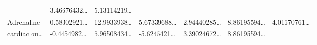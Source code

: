 \documentclass[
]{article}
\begin{document}
\begin{longtable}[]{@{}lllllll@{}}
\begin{minipage}[t]{0.12\columnwidth}
\end{minipage} & \begin{minipage}[t]{0.12\columnwidth}\raggedright
3.46676432\ldots{}\strut
\end{minipage} & \begin{minipage}[t]{0.12\columnwidth}\raggedright
5.13114219\ldots{}\strut
\end{minipage}\tabularnewline
\begin{minipage}[t]{0.12\columnwidth}\raggedright
Adrenaline\strut
\end{minipage} & \begin{minipage}[t]{0.12\columnwidth}\raggedright
0.58302921\ldots{}\strut
\end{minipage} & \begin{minipage}[t]{0.12\columnwidth}\raggedright
12.9933938\ldots{}\strut
\end{minipage} & \begin{minipage}[t]{0.12\columnwidth}\raggedright
5.67339688\ldots{}\strut
\end{minipage} & \begin{minipage}[t]{0.12\columnwidth}\raggedright
2.94440285\ldots{}\strut
\end{minipage} & \begin{minipage}[t]{0.12\columnwidth}\raggedright
8.86195594\ldots{}\strut
\end{minipage} & \begin{minipage}[t]{0.12\columnwidth}\raggedright
4.01670761\ldots{}\strut
\end{minipage}\tabularnewline
\begin{minipage}[t]{0.12\columnwidth}\raggedright
cardiac ou\ldots{}\strut
\end{minipage} & \begin{minipage}[t]{0.12\columnwidth}\raggedright
-0.4454982\ldots{}\strut
\end{minipage} & \begin{minipage}[t]{0.12\columnwidth}\raggedright
6.96508434\ldots{}\strut
\end{minipage} & \begin{minipage}[t]{0.12\columnwidth}\raggedright
-5.6245421\ldots{}\strut
\end{minipage} & \begin{minipage}[t]{0.12\columnwidth}\raggedright
3.39024672\ldots{}\strut
\end{minipage} & \begin{minipage}[t]{0.12\columnwidth}\raggedright
8.86195594\ldots{}\strut
\end{minipage} & \begin{minipage}[t]{0.12\columnwidth}\raggedright

\end{minipage}
\end{longtable}
\end{document}

